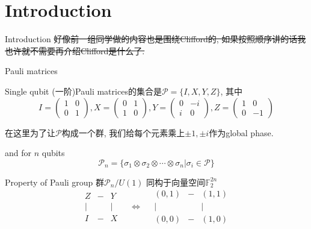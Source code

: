 \documentclass{beamer}
\begin{document}
\section{Introduction}
\begin{frame}{Introduction}
	\sout{好像前一组同学做的内容也是围绕Clifford的, 如果按照顺序讲的话我也许就不需要再介绍Clifford是什么了.}
\end{frame}
\begin{frame}{Pauli matrices}
\pause
\begin{block}{Single qubit}
	(一阶)Pauli matrices的集合是$\mathcal P = \{I, X, Y, Z\}$, 其中
	$$I = \begin{pmatrix}1&0\\0&1\end{pmatrix},
	X = \begin{pmatrix}0&1\\1&0\end{pmatrix},
	Y = \begin{pmatrix}0&-i\\i&0\end{pmatrix},
	Z = \begin{pmatrix}1&0\\0&-1\end{pmatrix}$$
	
	在这里为了让$\mathcal P$构成一个群, 我们给每个元素乘上$\pm 1, \pm i$作为global phase.
\end{block}\pause
\begin{block}{and for $n$ qubits}
	$$\mathcal P_n = \{\sigma_1 \otimes \sigma_2 \otimes \cdots \otimes \sigma_n | \sigma_i \in \mathcal P\}$$
\end{block}\pause
\begin{block}{Property of Pauli group}
	群$\mathcal P_n / U(1)$ 同构于向量空间$\mathbb F_2^{2n}$\pause
	$$\begin{matrix}
	Z&-&Y\\|&&|\\I&-&X
	\end{matrix} \quad\Leftrightarrow\quad \begin{matrix}
	(0,1)&-&(1,1)\\|&&|\\(0,0)&-&(1,0)
	\end{matrix}$$
\end{block}
\end{frame}
\end{document}
